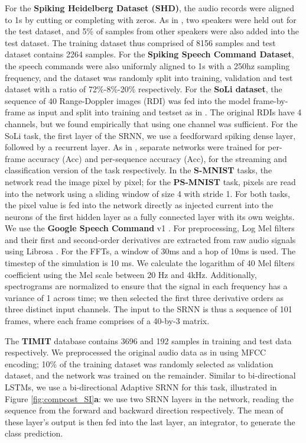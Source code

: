 \documentclass[fleqn,10pt]{wlscirep}
\begin{document}
For the {\bf Spiking Heidelberg Dataset (SHD)}, the audio records were aligned to 1s by cutting or completing with zeros. As in \cite{cramer2019heidelberg}, two speakers were held out for the test dataset, and 5\% of samples from other speakers were also added into the test dataset. The training dataset thus comprised of 8156 samples and test dataset contains 2264 samples. For the {\bf Spiking Speech Command Dataset}, 
the speech commands were also uniformly aligned to 1s with a 250hz sampling frequency, and the dataset was randomly split into training, validation and test dataset with a ratio of 72\%-8\%-20\% respectively.
For the {\bf SoLi dataset}, the sequence of 40 Range-Doppler images (RDI) was fed into the model frame-by-frame as input and split into training and testset as in \cite{wang2016interacting}. 
The original RDIs have 4 channels, but we found empirically that using one channel was sufficient. For the SoLi task, the first layer of the SRNN, we use a feedforward spiking dense layer, followed by a recurrent layer. As in \cite{wang2016interacting}, separate networks were trained for per-frame accuracy (Acc) and per-sequence accuracy (Acc), for the streaming and classification version of the task respectively. In the {\bf S-MNIST} tasks, the network read the image pixel by pixel; for the {\bf PS-MNIST} task, pixels are read into the network using a sliding window of size 4 with stride 1. For both tasks, the pixel value is fed into the network directly as injected current into the neurons of the first hidden layer as a fully connected layer with its own weights.  We use the {\bf Google Speech Command}  v1 \cite{warden2018speech}. 
For preprocessing, Log Mel filters and their first and second-order derivatives are extracted from raw audio signals using Librosa \cite{mcfee2015librosa}. For the FFTs, a window of 30ms and a hop of 10ms is used. The timestep of the simulation is 10 ms. We calculate the logarithm of 40 Mel filters coefficient using the Mel scale between 20 Hz and 4kHz. Additionally, spectrograms are normalized to ensure that the signal in each frequency has a variance of 1 across time; we then selected the first three derivative orders as three distinct input channels. The input to the SRNN is thus a sequence of 101 frames, where each frame comprises of a 40-by-3 matrix. 




The {\bf TIMIT} database contains 3696 and 192 samples in training and test data respectively. We preprocessed the original audio data as in \cite{bellec2020solution} using MFCC encoding; 10\% of the training dataset was randomly selected as validation dataset, and the network was trained on the remainder. Similar to bi-directional LSTMs, we use a bi-directional Adaptive SRNN for this task, illustrated in Figure \ref{fig:compcost_SI}\textbf{a}: we use  two SRNN layers in the network, reading the sequence from the forward and backward direction respectively. The mean of these layer's output is then fed into the last layer, an integrator, to generate the class prediction. 
\end{document}
